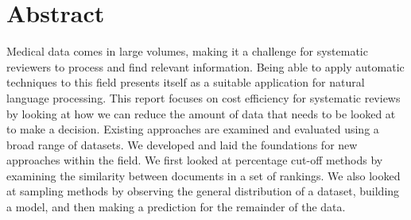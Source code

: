 \chapter*{\Large \center Abstract}

Medical data comes in large volumes, making it a challenge for systematic reviewers to process and find relevant information. Being able to apply automatic techniques to this field presents itself as a suitable application for natural language processing. This report focuses on cost efficiency for systematic reviews by looking at how we can reduce the amount of data that needs to be looked at to make a decision. Existing approaches are examined and evaluated using a broad range of datasets. We developed and laid the foundations for new approaches within the field. We first looked at percentage cut-off methods by examining the similarity between documents in a set of rankings. We also looked at sampling methods by observing the general distribution of a dataset, building a model, and then making a prediction for the remainder of the data. 
